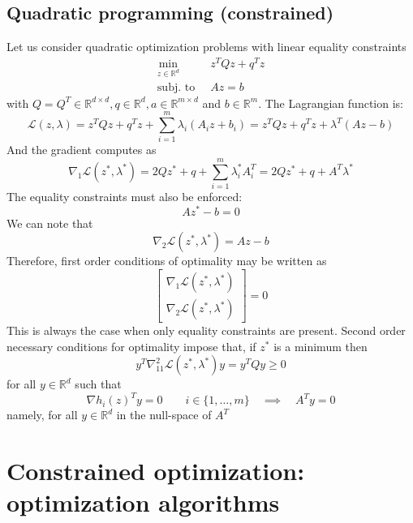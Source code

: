 \documentclass[openany]{book}
\newcommand{\R}{\mathbb{R}} %
\theoremstyle{definition}
\theoremstyle{remark}
\begin{document}
\subsection{Quadratic programming (constrained)}
Let us consider quadratic optimization problems with linear equality constraints 
\begin{align*}
    \min_{z\in\R^d}\ & z^TQz+q^Tz \\
    \text{subj. to }\ & Az=b
\end{align*}
with $Q=Q^T\in\R^{d\times d}, q\in\R^d, a\in\R^{m\times d}$ and $b\in\R^m$.
The Lagrangian function is:
\[
    \mathcal{L}(z,\lambda) = z^TQz + q^Tz +\displaystyle\sum_{i=1}^{m}\lambda_i(A_iz+b_i) =  z^TQz + q^Tz + \lambda^T(Az-b)
\]
And the gradient computes as 
\[
    \nabla_1 \mathcal{L}(z^*,\lambda^*) = 2Qz^* + q + \displaystyle\sum_{i=1}^{m}\lambda_i^*A_i^T =  2Qz^* + q + A^T\lambda^*
\]
The equality constraints must also be enforced: 
\[
    Az^*-b = 0
\]
We can note that 
\[
    \nabla_2\mathcal{L}(z^*,\lambda^*) = Az-b
\]
Therefore, first order conditions of optimality may be written as 
\[
    \begin{bmatrix}
        \nabla_1\mathcal{L}(z^*,\lambda^*)\\ \nabla_2\mathcal{L}(z^*,\lambda^*)
    \end{bmatrix} = 0
\]
This is always the case when only equality constraints are present. Second order necessary conditions for optimality impose that, if $z^*$ is a minimum then 
\[
    y^T\nabla^2_{11}\mathcal{L}(z^*,\lambda^*)y = y^TQy \geq 0
\]
for all $y\in\R^d$ such that 
\[
    \nabla h_i(z)^T y = 0 \qquad i\in\{1,\dots,m\} \quad \implies \quad A^Ty = 0
\]
namely, for all $y\in\R^d$ in the null-space of $A^T$
\section{Constrained optimization: optimization algorithms}
\end{document}
